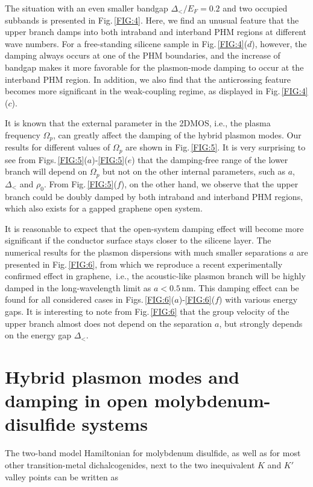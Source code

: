\documentclass[aps,prb,showpacs]{revtex4}
\begin{document}
The situation with an even smaller bandgap $\Delta_</E_F = 0.2$ and two occupied subbands is presented in Fig.\,\ref{FIG:4}. Here, we find an unusual feature 
that the upper branch damps into both intraband and interband PHM regions at different wave numbers. 
For a free-standing silicene sample in Fig.\,\ref{FIG:4}($d$), however, the damping always occurs at one of the PHM boundaries, and the increase of bandgap 
makes it more favorable for the plasmon-mode damping to occur at the interband PHM region. In addition, we also find that the anticrossing feature 
becomes more significant in the weak-coupling regime, as displayed in Fig.\,\ref{FIG:4}($c$).
\medskip

It is known that the external parameter in the 2DMOS, i.e., the plasma frequency $\Omega_p$, can greatly affect the damping of the hybrid plasmon modes. 
Our results for different values of $\Omega_p$ are shown in Fig.\,\ref{FIG:5}. It is very surprising to see from Figs.\,\ref{FIG:5}($a$)-\ref{FIG:5}($e$) that the damping-free range of the lower branch will depend on
$\Omega_p$ but not on the other internal parameters, such as $a$, $\Delta_<$ and $\rho_0$. From Fig.\,\ref{FIG:5}($f$), on the other hand, we observe that 
the upper branch could be doubly damped by both intraband and interband PHM regions, which also exists for a gapped graphene open system. 
\medskip

It is reasonable to expect that the open-system damping effect will become more significant if the conductor surface stays closer to the silicene layer.
The numerical results for the plasmon dispersions with much smaller separations $a$ are presented in Fig.\,\ref{FIG:6}, from which we reproduce a recent experimentally confirmed 
effect in graphene,\,\cite{poli1,poli2,poli3,hbook}  i.e., the acoustic-like plasmon branch will be highly damped in the long-wavelength limit as $a<0.5\,$nm. 
This damping effect can be found for all considered cases in Figs.\,\ref{FIG:6}($a$)-\ref{FIG:6}($f$) with various energy gaps. 
It is interesting to note from Fig.\,\ref{FIG:6} that the group velocity of the upper branch almost does not depend on the separation
$a$, but strongly depends on the energy gap $\Delta_<$. 

\section{Hybrid plasmon modes and damping in open molybdenum-disulfide systems}
\label{sect3}

The two-band model Hamiltonian for molybdenum disulfide, as well as for most other transition-metal dichalcogenides,
next to the two inequivalent $K$ and $K'$ valley points can be written as\,\cite{xiao-prl,mos2}
\end{document}
